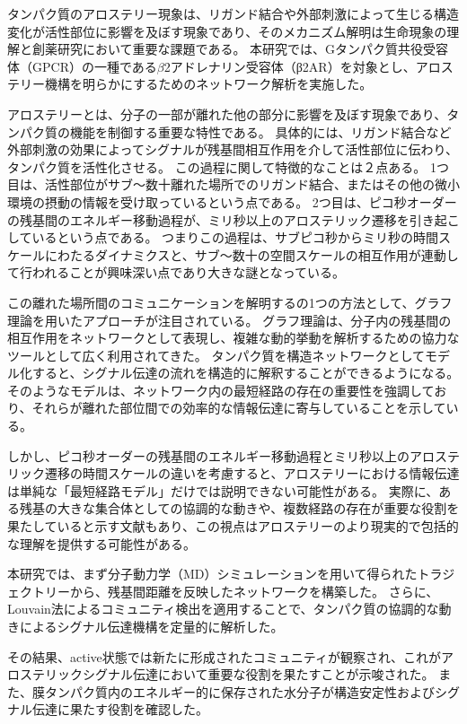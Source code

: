 タンパク質のアロステリー現象は、リガンド結合や外部刺激によって生じる構造変化が活性部位に影響を及ぼす現象であり、そのメカニズム解明は生命現象の理解と創薬研究において重要な課題である。
本研究では、Gタンパク質共役受容体（GPCR）の一種である$\beta$2アドレナリン受容体（β2AR）を対象とし、アロステリー機構を明らかにするためのネットワーク解析を実施した。

アロステリーとは、分子の一部が離れた他の部分に影響を及ぼす現象であり、タンパク質の機能を制御する重要な特性である。
具体的には、リガンド結合など外部刺激の効果によってシグナルが残基間相互作用を介して活性部位に伝わり、タンパク質を活性化させる。
この過程に関して特徴的なことは２点ある。
1つ目は、活性部位がサブ\text{\AA}～数十\text{\AA}離れた場所でのリガンド結合、またはその他の微小環境の摂動の情報を受け取っているという点である。
2つ目は、ピコ秒オーダーの残基間のエネルギー移動過程が、ミリ秒以上のアロステリック遷移を引き起こしているという点である。
つまりこの過程は、サブピコ秒からミリ秒の時間スケールにわたるダイナミクスと、サブ\text{\AA}～数十\text{\AA}の空間スケールの相互作用が連動して行われることが興味深い点であり大きな謎となっている。

この離れた場所間のコミュニケーションを解明するの1つの方法として、グラフ理論を用いたアプローチが注目されている。
グラフ理論は、分子内の残基間の相互作用をネットワークとして表現し、複雑な動的挙動を解析するための協力なツールとして広く利用されてきた。
タンパク質を構造ネットワークとしてモデル化すると、シグナル伝達の流れを構造的に解釈することができるようになる。
そのようなモデルは、ネットワーク内の最短経路の存在の重要性を強調しており、それらが離れた部位間での効率的な情報伝達に寄与していることを示している。

しかし、ピコ秒オーダーの残基間のエネルギー移動過程とミリ秒以上のアロステリック遷移の時間スケールの違いを考慮すると、アロステリーにおける情報伝達は単純な「最短経路モデル」だけでは説明できない可能性がある。
実際に、ある残基の大きな集合体としての協調的な動きや、複数経路の存在が重要な役割を果たしていると示す文献もあり、この視点はアロステリーのより現実的で包括的な理解を提供する可能性がある。

本研究では、まず分子動力学（MD）シミュレーションを用いて得られたトラジェクトリーから、残基間距離を反映したネットワークを構築した。
さらに、Louvain法によるコミュニティ検出を適用することで、タンパク質の協調的な動きによるシグナル伝達機構を定量的に解析した。

その結果、active状態では新たに形成されたコミュニティが観察され、これがアロステリックシグナル伝達において重要な役割を果たすことが示唆された。
また、膜タンパク質内のエネルギー的に保存された水分子が構造安定性およびシグナル伝達に果たす役割を確認した。